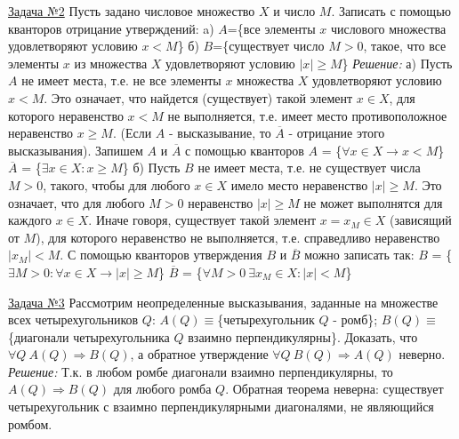 \documentclass[a4paper,12pt]{article} %
\begin{document}
\label{Problem2}
\underline{Задача №2} Пусть задано числовое множество $X$ и число $M$. Записать
с помощью кванторов отрицание утверждений:\newline
a) $A$=\{все элементы $x$ числового множества удовлетворяют условию $x<M$\}\newline
б) $B$=\{существует число $M>0$, такое, что все элементы $x$ из множества $X$ удовлетворяют условию $|x| \geqslant M$\}\newline
\textit{Решение:} 
а) Пусть $A$ не имеет места, т.е. не все элементы $x$ множества $X$
удовлетворяют условию $x<M$. Это означает, что найдется (существует) такой
элемент $x \in X$, для которого неравенство $x<M$ не выполняется, т.е. имеет
место противоположное неравенство $x \geqslant M$. (Если $A$ - высказывание, то
$\overline A$ - отрицание этого высказывания). Запишем $A$ и $\overline A$ с помощью кванторов\newline
$A$ = \{$\forall x \in X \rightarrow x < M$\}\newline
$\overline A$ = \{$\exists x \in X : x \geqslant M$\}  \newline
б) Пусть $B$ не имеет места, т.е. не существует числа $M>0$, такого, чтобы для
любого $x \in X$ имело место неравенство $|x| \geqslant M$. Это означает, что для
любого $M>0$ неравенство $|x| \geqslant M$ не может выполнятся для каждого $x \in X$.
Иначе говоря, существует такой элемент $x=x_M \in X$ (зависящий от $M$), для которого
неравенство не выполняется, т.е. справедливо неравенство $|x_M|<M$. С помощью кванторов
утверждения $B$ и $\overline B$ можно записать так:\newline
$B$ = \{$\exists M > 0 : \forall x \in X \rightarrow |x| \geqslant M$\}\newline
$\overline B$ = \{$\forall M > 0\ \exists x_M \in X : |x| < M$\}\newline

\label{Problem3}
\underline{Задача №3} Рассмотрим неопределенные высказывания, заданные на множестве
всех четырехугольников $Q$:\newline
$A(Q) \equiv $\{четырехугольник $Q$ - ромб\}; \newline
$B(Q) \equiv $\{диагонали четырехугольника $Q$ взаимно перпендикулярны\}. \newline
Доказать, что $\forall Q\ A(Q) \Rightarrow B(Q)$, а обратное утверждение 
$\forall Q\ B(Q) \Rightarrow A(Q)$ неверно.\newline
\textit{Решение:} 
Т.к. в любом ромбе диагонали взаимно перпендикулярны, то
$A(Q) \Rightarrow B(Q)$ для любого ромба $Q$. Обратная теорема неверна: существует
четырехугольник с взаимно перпендикулярными диагоналями, не являющийся ромбом.\newline
\end{document}
